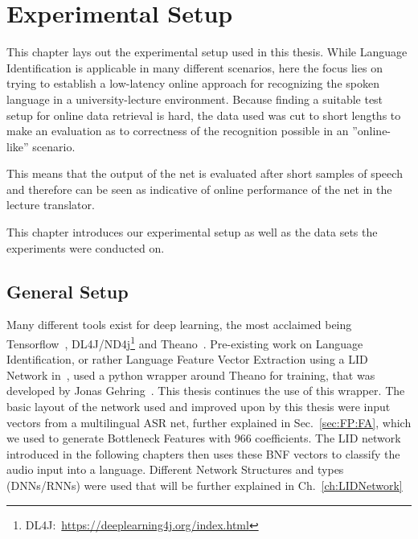 




\chapter{Experimental Setup}
\label{ch:LITasks}

This chapter lays out the experimental setup used in this thesis. While Language Identification is applicable in many different scenarios, here the focus lies on trying to establish a low-latency online approach for recognizing the spoken language in a university-lecture environment. Because finding a suitable test setup for online data retrieval is hard, the data used was cut to short lengths to make an evaluation as to correctness of the recognition possible in an ''online-like'' scenario. 

This means that the output of the net is evaluated after short samples of speech and therefore can be seen as indicative of online performance of the net in the lecture translator.

This chapter introduces our experimental setup as well as the data sets the experiments were conducted on.

\section{General Setup}
\label{sec:LITasks:GS}

Many different tools exist for deep learning, the most acclaimed being Tensorflow~\cite{DBLP:journals/corr/AbadiABBCCCDDDG16}, DL4J/ND4j\footnote{DL4J:~\url{https://deeplearning4j.org/index.html}} and Theano~\cite{bergstra2011theano}. Pre-existing work on Language Identification, or rather Language Feature Vector Extraction using a LID Network in~\cite{Mueller2016b}, used a python wrapper around Theano for training, that was developed by Jonas Gehring~\cite{gehringMA}. This thesis continues the use of this wrapper. The basic layout of the network used and improved upon by this thesis were input vectors from a multilingual ASR net, further explained in Sec.~\ref{sec:FP:FA}, which we used to generate Bottleneck Features with 966 coefficients. The LID network introduced in the following chapters then uses these BNF vectors to classify the audio input into a language. Different Network Structures and types (DNNs/RNNs) were used that will be further explained in Ch.~\ref{ch:LIDNetwork}


